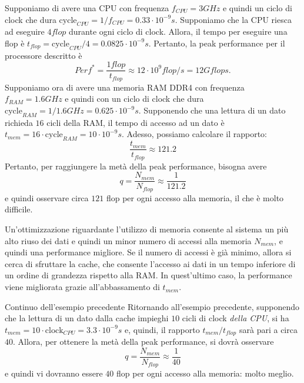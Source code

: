 \begin{example}{}
    Supponiamo di avere una CPU con frequenza \(f_{CPU} = 3 GHz\) e quindi un ciclo di clock che dura \(\text{cycle}_{CPU} = 1 / f_{CPU} = 0.33\cdot 10^{-9} s\).
    Supponiamo che la CPU riesca ad eseguire \(4 flop\) durante ogni ciclo di clock. 
    Allora, il tempo per eseguire una flop è \(t_{flop} = \text{cycle}_{CPU} / 4 = 0.0825 \cdot 10^{-9} s\).
    Pertanto, la peak performance per il processore descritto è
    \[ Perf^* = \frac{1 flop}{t_{flop}} \approx 12\cdot 10^{9} flop/s = 12 Gflops. \]
    Supponiamo ora di avere una memoria RAM DDR4 con frequenza \(f_{RAM} = 1.6GHz\) e quindi con un ciclo di clock che dura \(\text{cycle}_{RAM} = 1 / 1.6 GHz = 0.625\cdot 10^{-9} s\). 
    Supponendo che una lettura di un dato richieda \(16\) cicli della RAM, il tempo di accesso ad un dato è \(t_{mem} = 16\cdot \text{cycle}_{RAM} = 10\cdot 10^{-9} s\).
    Adesso, possiamo calcolare il rapporto:
    \[\frac{t_{mem}}{t_{flop}} \approx 121.2\]
    Pertanto, per raggiungere la metà della peak performance, bisogna avere
    \[q = \frac{N_{mem}}{N_{flop}} \approx \frac{1}{121.2}\]
    e quindi osservare circa \(121\) flop per ogni accesso alla memoria, il che è molto difficile.
\end{example}

Un'ottimizzazione riguardante l'utilizzo di memoria consente al sistema un più alto riuso dei dati e quindi un minor numero di accessi alla memoria \(N_{mem}\), e quindi una performance migliore.
Se il numero di accessi è già minimo, allora si cerca di sfruttare la cache, che consente l'accesso ai dati in un tempo inferiore di un ordine di grandezza rispetto alla RAM.
In quest'ultimo caso, la performance viene migliorata grazie all'abbassamento di \(t_{mem}\).

\begin{example}{Continuo dell'esempio precedente}
    Ritornando all'esempio precedente, supponendo che la lettura di un dato dalla cache impieghi \(10\) cicli di clock \emph{della CPU}, si ha \(t_{mem} = 10 \cdot \text{clock}_{CPU} = 3.3\cdot 10^{-9} s\) e, quindi, il rapporto \(t_{mem}/t_{flop}\) sarà pari a circa \(40\).
    Allora, per ottenere la metà della peak performance, si dovrà osservare
    \[ q = \frac{N_{mem}}{N_{flop}} \approx \frac{1}{40} \]
    e quindi vi dovranno essere \(40\) flop per ogni accesso alla memoria: molto meglio.
\end{example}

